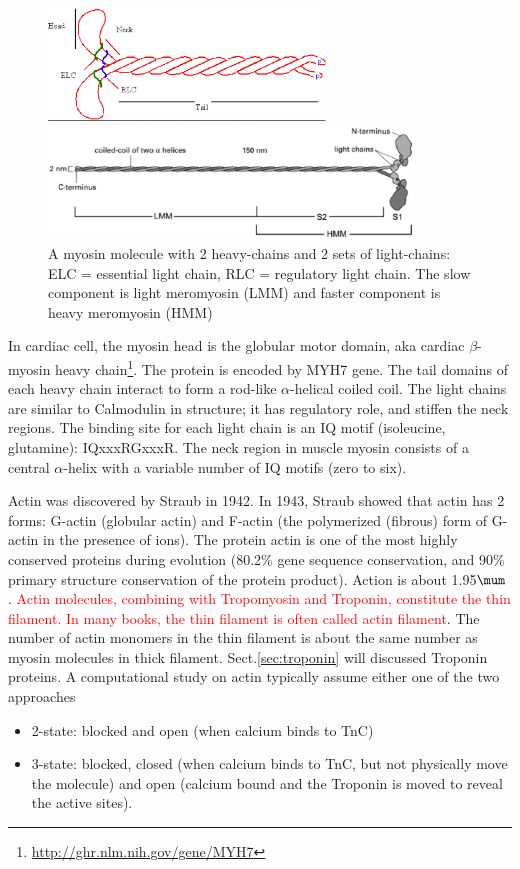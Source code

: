 \begin{figure}[hbt]
  \centerline{\includegraphics[height=3cm,
    angle=0]{./images/myosin_II.eps}}
      \centerline{\includegraphics[height=3cm,
    angle=0]{./images/myosin_molecule.eps}}
\caption{A myosin molecule with 2 heavy-chains and 2 sets of light-chains: ELC =
essential light chain, RLC = regulatory light chain. The slow component is
light meromyosin (LMM) and faster component is heavy meromyosin
(HMM)\citep{szent-gyorgyi2004}}
\label{fig:myosin_II}
\end{figure}

In cardiac cell, the myosin head is the globular motor domain, aka cardiac
$\beta$-myosin heavy chain\footnote{\url{http://ghr.nlm.nih.gov/gene/MYH7}}. The
protein is encoded by MYH7 gene. The tail domains of each heavy chain interact
to form a rod-like $\alpha$-helical coiled coil. The light chains are similar to
Calmodulin in structure; it has regulatory role, and stiffen the neck regions.
The binding site for each light chain is an IQ motif (isoleucine, glutamine):
IQxxxRGxxxR. The neck region in muscle myosin consists of a central
$\alpha$-helix with a variable number of IQ motifs (zero to six).


Actin was discovered by Straub in 1942. In 1943, Straub showed that actin has 2
forms: G-actin (globular actin) and F-actin (the polymerized (fibrous) form of
G-actin in the presence of ions). The protein actin is one of the most highly
conserved proteins during evolution (80.2\% gene sequence conservation, and 90\%
primary structure conservation of the protein product). Action is about
1.95$\mum$ \citep{page1968}. \textcolor{red}{Actin molecules, combining with
Tropomyosin and Troponin, constitute the thin filament. In many books, the thin
filament is often called actin filament}. The number of actin monomers in the
thin filament is about the same number as myosin molecules in thick filament.
Sect.\ref{sec:troponin} will discussed Troponin proteins.
A computational study on actin typically assume either one of the two approaches
\begin{itemize}
  \item 2-state: blocked and open (when calcium binds to TnC)
  \item 3-state: blocked, closed (when calcium binds to TnC, but not
  physically move the molecule) and open (calcium bound and the Troponin is
  moved to reveal the active sites).
\end{itemize}


